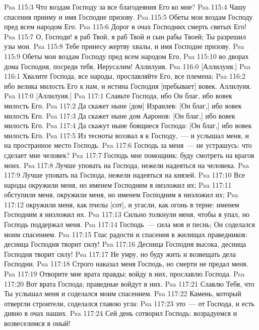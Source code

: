 \vs Psa 115:3 Что воздам Господу за все благодеяния Его ко мне?
\vs Psa 115:4 Чашу спасения прииму и имя Господне призову.
\vs Psa 115:5 Обеты мои воздам Господу пред всем народом Его.
\vs Psa 115:6 Дорог в очах Господних смерть святых Его!
\vs Psa 115:7 О, Господи! я раб Твой, я раб Твой и сын рабы Твоей; Ты разрешил узы мои.
\vs Psa 115:8 Тебе принесу жертву хвалы, и имя Господне призову.
\vs Psa 115:9 Обеты мои воздам Господу пред всем народом Его,
\vs Psa 115:10 во дворах дома Господня, посреди тебя, Иерусалим! Аллилуия.
\vs Psa 116:0 [Аллилуия.]
\rsbpar\vs Psa 116:1 Хвалите Господа, все народы, прославляйте Его, все племена;
\vs Psa 116:2 ибо велика милость Его к нам, и истина Господня [пребывает] вовек. Аллилуия.
\vs Psa 117:0 [Аллилуия.]
\rsbpar\vs Psa 117:1 Славьте Господа, ибо Он благ, ибо вовек милость Его.
\vs Psa 117:2 Да скажет ныне [дом] Израилев: [Он благ,] ибо вовек милость Его.
\vs Psa 117:3 Да скажет ныне дом Ааронов: [Он благ,] ибо вовек милость Его.
\vs Psa 117:4 Да скажут ныне боящиеся Господа: [Он благ,] ибо вовек милость Его.
\vs Psa 117:5 Из тесноты воззвал я к Господу,~--- и услышал меня, и на пространное место  Господь.
\vs Psa 117:6 Господь за меня~--- не устрашусь: что сделает мне человек?
\vs Psa 117:7 Господь мне помощник: буду смотреть на врагов моих.
\vs Psa 117:8 Лучше уповать на Господа, нежели надеяться на человека.
\vs Psa 117:9 Лучше уповать на Господа, нежели надеяться на князей.
\vs Psa 117:10 Все народы окружили меня, но именем Господним я низложил их;
\vs Psa 117:11 обступили меня, окружили меня, но именем Господним я низложил их;
\vs Psa 117:12 окружили меня, как пчелы [сот], и угасли, как огонь в терне: именем Господним я низложил их.
\vs Psa 117:13 Сильно толкнули меня, чтобы я упал, но Господь поддержал меня.
\vs Psa 117:14 Господь~--- сила моя и песнь; Он соделался моим спасением.
\vs Psa 117:15 Глас радости и спасения в жилищах праведников: десница Господня творит силу!
\vs Psa 117:16 Десница Господня высока, десница Господня творит силу!
\vs Psa 117:17 Не умру, но буду жить и возвещать дела Господни.
\vs Psa 117:18 Строго наказал меня Господь, но смерти не предал меня.
\vs Psa 117:19 Отворите мне врата правды; войду в них, прославлю Господа.
\vs Psa 117:20 Вот врата Господа; праведные войдут в них.
\vs Psa 117:21 Славлю Тебя, что Ты услышал меня и соделался моим спасением.
\vs Psa 117:22 Камень, который отвергли строители, соделался главою угла:
\vs Psa 117:23 это~--- от Господа, и есть дивно в очах наших.
\vs Psa 117:24 Сей день сотворил Господь: возрадуемся и возвеселимся в оный!
